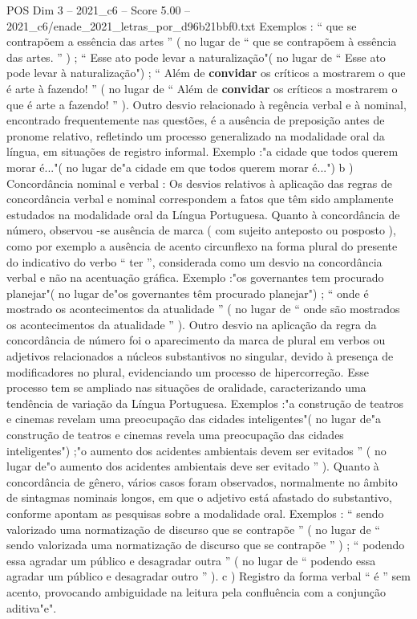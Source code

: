 \begin{textsample}{POS Dim 3 – 2021\_c6 – Score 5.00 – 2021\_c6/enade\_2021\_letras\_por\_d96b21bbf0.txt}
Exemplos : “ que se contrapõem a essência das artes ” ( no lugar de “ que se contrapõem à essência das artes. ” ) ; “ Esse ato pode levar a naturalização"( no lugar de “ Esse ato pode levar à naturalização") ; “ Além de \textbf{convidar} os críticos a mostrarem o que é arte à fazendo! ” ( no lugar de “ Além de \textbf{convidar} os críticos a mostrarem o que é arte a fazendo! ” ).
Outro desvio relacionado à regência verbal e à nominal, encontrado frequentemente nas questões, é a ausência de preposição antes de pronome relativo, refletindo um processo generalizado na modalidade oral da língua, em situações de registro informal.
Exemplo :"a cidade que todos querem morar é..."( no lugar de"a cidade em que todos querem morar é...") b ) Concordância nominal e verbal : Os desvios relativos à aplicação das regras de concordância verbal e nominal correspondem a fatos que têm sido amplamente estudados na modalidade oral da Língua Portuguesa.
Quanto à concordância de número, observou -se ausência de marca ( com sujeito anteposto ou posposto ), como por exemplo a ausência de acento circunflexo na forma plural do presente do indicativo do verbo “ ter ”, considerada como um desvio na concordância verbal e não na acentuação gráfica.
Exemplo :"os governantes tem procurado planejar"( no lugar de"os governantes têm procurado planejar") ; “ onde é mostrado os acontecimentos da atualidade ” ( no lugar de “ onde são mostrados os acontecimentos da atualidade ” ).
Outro desvio na aplicação da regra da concordância de número foi o aparecimento da marca de plural em verbos ou adjetivos relacionados a núcleos substantivos no singular, devido à presença de modificadores no plural, evidenciando um processo de hipercorreção.
Esse processo tem se ampliado nas situações de oralidade, caracterizando uma tendência de variação da Língua Portuguesa.
Exemplos :"a construção de teatros e cinemas revelam uma preocupação das cidades inteligentes"( no lugar de"a construção de teatros e cinemas revela uma preocupação das cidades inteligentes") ;"o aumento dos acidentes ambientais devem ser evitados ” ( no lugar de"o aumento dos acidentes ambientais deve ser evitado ” ).
Quanto à concordância de gênero, vários casos foram observados, normalmente no âmbito de sintagmas nominais longos, em que o adjetivo está afastado do substantivo, conforme apontam as pesquisas sobre a modalidade oral.
Exemplos : “ sendo valorizado uma normatização de discurso que se contrapõe ” ( no lugar de “ sendo valorizada uma normatização de discurso que se contrapõe ” ) ; “ podendo essa agradar um público e desagradar outra ” ( no lugar de “ podendo essa agradar um público e desagradar outro ” ). c ) Registro da forma verbal “ é ” sem acento, provocando ambiguidade na leitura pela confluência com a conjunção aditiva"e".

\end{textsample}
